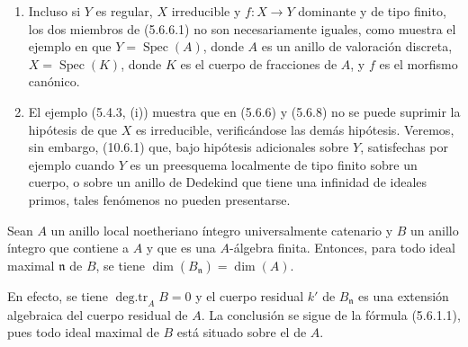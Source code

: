 \begin{remarks}[5.6.9]
\label{IV.2.s5.6.9-fr}
\begin{enumerate}
\item[(i)] Incluso si $Y$ es regular, $X$ irreducible y $f:X\to Y$ dominante
y de tipo finito, los dos miembros de (5.6.6.1) no son necesariamente iguales,
como muestra el ejemplo en que $Y=\operatorname{Spec}(A)$, donde $A$ es un
anillo de valoración discreta, $X=\operatorname{Spec}(K)$, donde $K$ es el
cuerpo de fracciones de $A$, y $f$ es el morfismo canónico.
\item[(ii)] El ejemplo (5.4.3, (i)) muestra que en (5.6.6) y (5.6.8) no se
puede suprimir la hipótesis de que $X$ es irreducible, verificándose las demás
hipótesis. Veremos, sin embargo, (10.6.1) que, bajo hipótesis adicionales sobre
$Y$, satisfechas por ejemplo cuando $Y$ es un preesquema localmente de tipo
finito sobre un cuerpo, o sobre un anillo de Dedekind que tiene una infinidad
de ideales primos, tales fenómenos no pueden presentarse.
\end{enumerate}
\end{remarks}

\begin{proposition}[5.6.10]
\label{IV.2.s5.6.10-fr}
Sean $A$ un anillo local noetheriano íntegro universalmente catenario y $B$
un anillo íntegro que contiene a $A$ y que es una $A$-álgebra finita. Entonces,
para todo ideal maximal $\mathfrak n$ de $B$, se tiene
$\dim(B_{\mathfrak n})=\dim(A)$.
\end{proposition}

En efecto, se tiene $\operatorname{deg.tr}_A B=0$ y el cuerpo residual $k'$
de $B_{\mathfrak n}$ es una extensión algebraica del cuerpo residual de
$A$. La conclusión se sigue de la fórmula (5.6.1.1), pues todo ideal maximal
de $B$ está situado sobre el de $A$.

